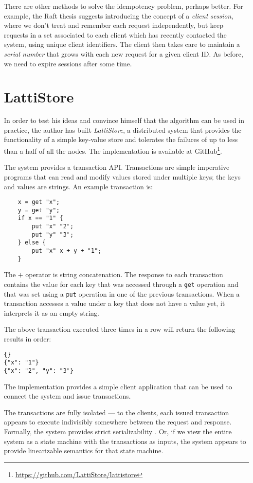 \documentclass[12pt,a4paper,en]{pracamgr}
\newcommand{\ti}[1]{\textit{#1}}
\begin{document}
There are other methods to solve the idempotency problem, perhaps better. For example, the Raft thesis \cite{bridging} suggests introducing the concept of a \ti{client session}, where we don't treat and remember each request independently, but keep requests in a set associated to each client which has recently contacted the system, using unique client identifiers. The client then takes care to maintain a \ti{serial number} that grows with each new request for a given client ID. As before, we need to expire sessions after some time.

\section{LattiStore}\label{lstore}

In order to test his ideas and convince himself that the algorithm can be used in practice, the author has built \ti{LattiStore}, a distributed system that provides the functionality of a simple key-value store and tolerates the failures of up to less than a half of all the nodes. The implementation is available at GitHub\footnote{\url{https://github.com/LattiStore/lattistore}}.

The system provides a transaction API. Transactions are simple imperative programs that can read and modify values stored under multiple keys; the keys and values are strings. An example transaction is:
\begin{verbatim}
    x = get "x";
    y = get "y";
    if x == "1" {
        put "x" "2";
        put "y" "3";
    } else {
        put "x" x + y + "1";
    }
\end{verbatim}
The $+$ operator is string concatenation. The response to each transaction contains the value for each key that was accessed through a \verb#get# operation and that was set using a \verb#put# operation in one of the previous transactions. When a transaction accesses a value under a key that does not have a value yet, it interprets it as an empty string.

The above transaction executed three times in a row will return the following results in order:
\begin{verbatim}{}
{"x": "1"}
{"x": "2", "y": "3"}\end{verbatim}
The implementation provides a simple client application that can be used to connect the system and issue transactions.

The transactions are fully isolated --- to the clients, each issued transaction appears to execute indivisibly somewhere between the request and response. Formally, the system provides strict serializability \cite{h&w}. Or, if we view the entire system as a state machine with the transactions as inputs, the system appears to provide linearizable semantics for that state machine.
\end{document}
